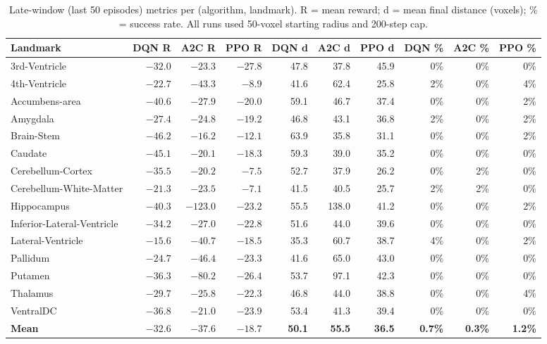 \documentclass[11pt]{article}
\begin{document}
\begin{table}[H]
\centering
\footnotesize
\caption{Late-window (last 50 episodes) metrics per (algorithm, landmark). R = mean reward; d = mean final distance (voxels); \% = success rate. All runs used 50-voxel starting radius and 200-step cap.}
\label{tab:summary}
\begin{tabular}{lrrrrrrrrr}
\toprule
Landmark & DQN R & A2C R & PPO R & DQN d & A2C d & PPO d & DQN \% & A2C \% & PPO \% \\
\midrule
3rd-Ventricle              & $-32.0$ &  $-23.3$ & $-27.8$ &  47.8 &  37.8 &  45.9 & 0\% & 0\% & 0\% \\
4th-Ventricle              & $-22.7$ &  $-43.3$ &  $-8.9$ &  41.6 &  62.4 &  25.8 & 2\% & 0\% & 4\% \\
Accumbens-area             & $-40.6$ &  $-27.9$ & $-20.0$ &  59.1 &  46.7 &  37.4 & 0\% & 0\% & 2\% \\
Amygdala                   & $-27.4$ &  $-24.8$ & $-19.2$ &  46.8 &  43.1 &  36.8 & 2\% & 0\% & 2\% \\
Brain-Stem                 & $-46.2$ &  $-16.2$ & $-12.1$ &  63.9 &  35.8 &  31.1 & 0\% & 0\% & 2\% \\
Caudate                    & $-45.1$ &  $-20.1$ & $-18.3$ &  59.3 &  39.0 &  35.2 & 0\% & 0\% & 0\% \\
Cerebellum-Cortex          & $-35.5$ &  $-20.2$ &  $-7.5$ &  52.7 &  37.9 &  26.2 & 0\% & 2\% & 0\% \\
Cerebellum-White-Matter    & $-21.3$ &  $-23.5$ &  $-7.1$ &  41.5 &  40.5 &  25.7 & 2\% & 2\% & 0\% \\
Hippocampus                & $-40.3$ & $-123.0$ & $-23.2$ &  55.5 & 138.0 &  41.2 & 0\% & 0\% & 2\% \\
Inferior-Lateral-Ventricle & $-34.2$ &  $-27.0$ & $-22.8$ &  51.6 &  44.0 &  39.6 & 0\% & 0\% & 0\% \\
Lateral-Ventricle          & $-15.6$ &  $-40.7$ & $-18.5$ &  35.3 &  60.7 &  38.7 & 4\% & 0\% & 2\% \\
Pallidum                   & $-24.7$ &  $-46.4$ & $-23.3$ &  41.6 &  65.0 &  43.0 & 0\% & 0\% & 0\% \\
Putamen                    & $-36.3$ &  $-80.2$ & $-26.4$ &  53.7 &  97.1 &  42.3 & 0\% & 0\% & 0\% \\
Thalamus                   & $-29.7$ &  $-25.8$ & $-22.3$ &  46.8 &  44.0 &  38.8 & 0\% & 0\% & 4\% \\
VentralDC                  & $-36.8$ &  $-21.0$ & $-23.9$ &  53.4 &  41.3 &  39.4 & 0\% & 0\% & 0\% \\
\midrule
\textbf{Mean}              & $\mathbf{-32.6}$ & $\mathbf{-37.6}$ & $\mathbf{-18.7}$ & \textbf{50.1} & \textbf{55.5} & \textbf{36.5} & \textbf{0.7\%} & \textbf{0.3\%} & \textbf{1.2\%} \\
\bottomrule
\end{tabular}
\end{table}
\end{document}
